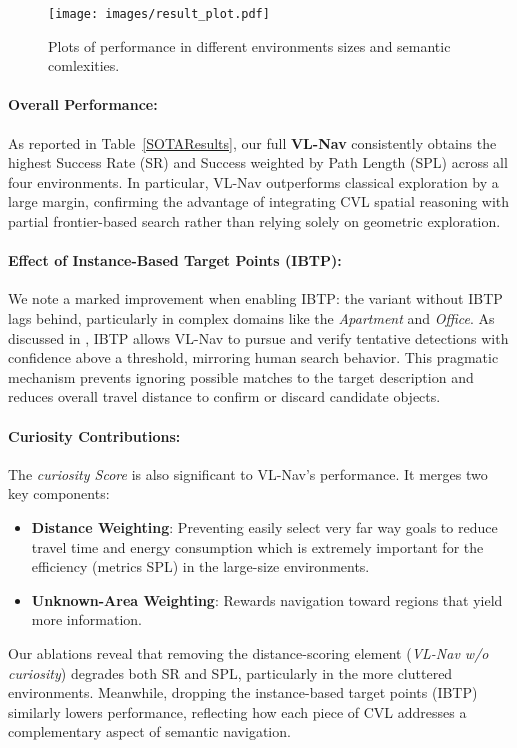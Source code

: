 \begin{figure*}[t]
    \centering
    \texttt{[image: images/result\_plot.pdf]} 
    \captionsetup{
    width=\textwidth,
    font=Smallfont,
    labelfont=Smallfont,
    textfont=Smallfont
    }
    \caption{Plots of performance in different environments sizes and semantic comlexities.}
    \label{fig:results}
\end{figure*}

\paragraph{Overall Performance:}
As reported in Table~\ref{SOTAResults}, our full \textbf{VL-Nav} consistently obtains the highest Success Rate (SR) and Success weighted by Path Length (SPL) across all four environments. In particular, VL-Nav outperforms classical exploration by a large margin, confirming the advantage of integrating CVL spatial reasoning with partial frontier-based search rather than relying solely on geometric exploration.

\paragraph{Effect of Instance-Based Target Points (IBTP):}
We note a marked improvement when enabling IBTP: the variant without IBTP lags behind, particularly in complex domains like the \textit{Apartment} and \textit{Office}. As discussed in , IBTP allows VL-Nav to pursue and verify tentative detections with confidence above a threshold, mirroring human search behavior. This pragmatic mechanism prevents ignoring possible matches to the target description and reduces overall travel distance to confirm or discard candidate objects.

\paragraph{Curiosity Contributions:}
The \emph{curiosity Score} is also significant to VL-Nav’s performance. It merges two key components:
\begin{itemize}
    \item \textbf{Distance Weighting}: Preventing easily select very far way goals to reduce travel time and energy consumption which is extremely important for the efficiency (metrics SPL) in the large-size environments.
    \item \textbf{Unknown-Area Weighting}: Rewards navigation toward regions that yield more information.
\end{itemize}
Our ablations reveal that removing the distance-scoring element (\textit{VL-Nav w/o curiosity}) degrades both SR and SPL, particularly in the more cluttered environments. Meanwhile, dropping the instance-based target points (IBTP) similarly lowers performance, reflecting how each piece of CVL addresses a complementary aspect of semantic navigation.

